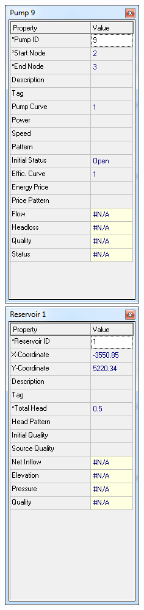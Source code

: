 \documentclass[12pt]{article}
\begin{document}
\begin{figure}[h!]
	\centering
	\includegraphics[scale=0.35]{imatges/epanet/car/bomba.png}
	\includegraphics[scale=0.35]{imatges/epanet/car/diposit.png}

\end{figure}
\end{document}
